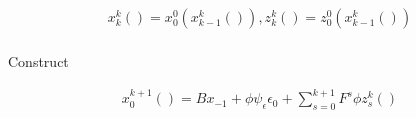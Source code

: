 \documentclass[letter]{beamer}
\begin{document}
\begin{frame}


  \begin{gather*}
    x_k^k()=x_0^0(x_{k-1}^k()),     z_k^k()=z_0^0(x_{k-1}^k())\\
  \end{gather*}

  Construct

  \begin{gather*}
x_0^{k+1}()=B x_{-1} +\phi \psi_\epsilon \epsilon_0 + \sum_{s=0}^{k+1} F^{s} \phi z_s^{k}()\\
  \end{gather*}
\end{frame}


\end{document}

